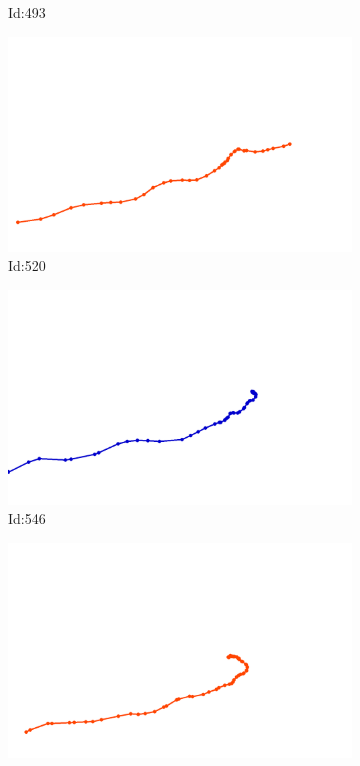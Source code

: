 \documentclass[12pt,twoside]{report}
\begin{document}
\begin{figure}
\begin{subfigure}[b]{0.20\textwidth}
\caption{Id:493}
\end{subfigure}
\begin{subfigure}[b]{0.20\textwidth}
\centering
\includegraphics[width=\textwidth]{../trajectories/520.png}
\caption{Id:520}
\end{subfigure}
\begin{subfigure}[b]{0.20\textwidth}
\centering
\includegraphics[width=\textwidth]{../trajectories/546.png}
\caption{Id:546}
\end{subfigure}
\begin{subfigure}[b]{0.20\textwidth}
\centering
\includegraphics[width=\textwidth]{../trajectories/590.png}

\end{subfigure}
\end{figure}
\end{document}
